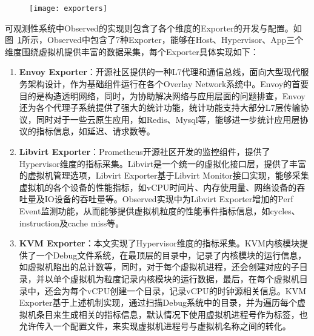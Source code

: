 \begin{figure}[!htbp]
    \centering
    \texttt{[image: exporters]}
    \label{fig:exporters} 
\end{figure}

可观测性系统中Observed的实现则包含了各个维度的Exporter的开发与配置。如图~\ref{fig:exporters}所示，Observed中包含了7种Exporter，能够在Host、Hypervisor、App三个维度围绕虚拟机提供丰富的数据采集，每个Exporter具体实现如下：

\begin{enumerate}
    \item \textbf{Envoy Exporter}：开源社区提供的一种L7代理和通信总线，面向大型现代服务架构设计，作为基础组件运行在各个Overlay Network系统中。Envoy的首要目的是构造透明网络，同时，为协助解决网络与应用层面的问题排查，Envoy还为各个代理子系统提供了强大的统计功能，统计功能支持大部分L7层传输协议，同时对于一些云原生应用，如Redis、Mysql等，能够进一步统计应用层协议的指标信息，如延迟、请求数等。
    
    \item \textbf{Libvirt Exporter}：Prometheus开源社区开发的监控组件，提供了Hypervisor维度的指标采集。Libvirt是一个统一的虚拟化接口层，提供了丰富的虚拟机管理选项，Libvirt Exporter基于Libvirt Monitor接口实现，能够采集虚拟机的各个设备的性能指标，如vCPU时间片、内存使用量、网络设备的吞吐量及IO设备的吞吐量等。Observed实现中为Libvirt Exporter增加的Perf Event监测功能，从而能够提供虚拟机粒度的性能事件指标信息，如cycles、instruction及cache miss等。
    
    \item \textbf{KVM Exporter}：本文实现了Hypervisor维度的指标采集。KVM内核模块提供了一个Debug文件系统，在最顶层的目录中，记录了内核模块的运行信息，如虚拟机陷出的总计数等，同时，对于每个虚拟机进程，还会创建对应的子目录，并以单个虚拟机为粒度记录内核模块的运行数据，最后，在每个虚拟机目录中，还会为每个vCPU创建一个目录，记录vCPU的时钟源相关信息。KVM Exporter基于上述机制实现，通过扫描Debug系统中的目录，并为遍历每个虚拟机条目来生成相关的指标信息，默认情况下使用虚拟机进程号作为标签，也允许传入一个配置文件，来实现虚拟机进程号与虚拟机名称之间的转化。


\end{enumerate}
